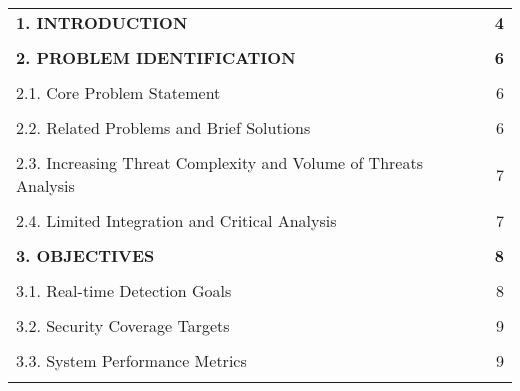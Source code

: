 \documentclass[12pt]{article}
\begin{document}
\fontsize{12}{14}\selectfont
\begin{spacing}{1.0}
\vspace{0.5cm}

\begin{tabular}{@{} p{} r @{}}
\textbf{1. INTRODUCTION} & \textbf{4} \\
\vspace{0.2cm} & \\

\textbf{2. PROBLEM IDENTIFICATION} & \textbf{6} \\
\vspace{0.1cm} & \\
\hspace{1em}2.1. Core Problem Statement & 6 \\
\vspace{0.1cm} & \\
\hspace{1em}2.2.  Related Problems and Brief Solutions & 6 \\
\vspace{0.1cm} & \\
\hspace{1em}2.3. Increasing Threat Complexity and Volume of Threats Analysis & 7 \\
\vspace{0.1cm} & \\
\hspace{1em}2.4. Limited Integration and Critical Analysis & 7 \\
\vspace{0.2cm} & \\

\textbf{3. OBJECTIVES} & \textbf{8} \\
\vspace{0.1cm} & \\
\hspace{1em}3.1. Real-time Detection Goals & 8 \\
\vspace{0.1cm} & \\
\hspace{1em}3.2. Security Coverage Targets & 9 \\
\vspace{0.1cm} & \\
\hspace{1em}3.3. System Performance Metrics & 9 \\
\vspace{0.2cm} & \\


\end{tabular}
\end{spacing}
\end{document}
